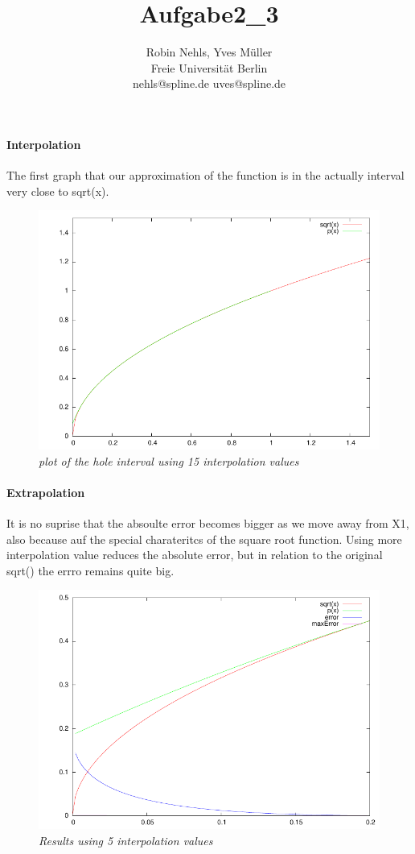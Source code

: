 \documentclass[11pt,a4paper,notitlepage,onecolumn]{article}
\title{Aufgabe2\_3}
\author{Robin Nehls, Yves Müller\\
  Freie Universit\"at Berlin\\
  nehls@spline.de uves@spline.de }
\date{}
\begin{document}
\maketitle

\paragraph{Interpolation}
The first graph that our approximation of the function is in the actually interval 
very close to sqrt(x).

\begin{figure}
\centering
\includegraphics[width=\textwidth]{data/aufgabe4-1IP.pdf}
\caption{\em \small plot of the hole interval using 15 interpolation values}
\end{figure}

\paragraph{Extrapolation}
It is no suprise that the absoulte error becomes bigger as we move away from X1,
also because auf the special charateritcs of the square root function. Using more
interpolation value reduces the absolute error, but in relation to the original
sqrt() the errro remains quite big.

\begin{figure}
\centering
\includegraphics[width=\textwidth]{data/aufgabe4-1based5.pdf}
\caption{\em \small Results using 5 interpolation values}
\end{figure}
\end{document}
